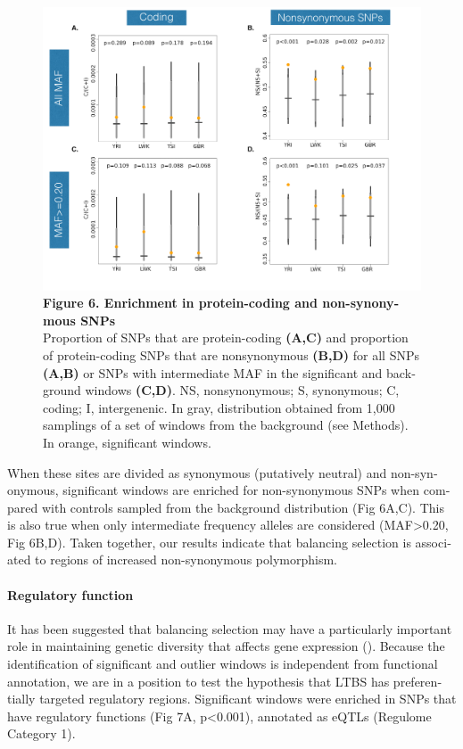 \begin{refsection}
\begin{otherlanguage}{english}
\begin{figure}[!ht]
\centering
\includegraphics[]{chap2_folder/Figures/Fig6.tiff}
\caption*{\textbf{Figure 6. Enrichment in protein-coding and non-synonymous SNPs}\\ 
Proportion of SNPs that are protein-coding \textbf{(A,C)} and proportion of protein-coding SNPs that are nonsynonymous \textbf{(B,D)} for all SNPs \textbf{(A,B)} or SNPs with intermediate MAF in the significant and background windows \textbf{(C,D)}. NS, nonsynonymous; S, synonymous; C, coding; I, intergenenic. In gray, distribution obtained from 1,000 samplings of a set of windows from the background (see Methods). In orange, significant windows.}
\end{figure}

When these sites are divided as synonymous (putatively neutral) and non-synonymous, significant windows are enriched for non-synonymous SNPs when compared with controls sampled from the background distribution (Fig 6A,C). This is also true when only intermediate frequency alleles are considered (MAF>0.20, Fig 6B,D). Taken together, our results indicate that balancing selection is associated to regions of increased non-synonymous polymorphism.

\paragraph{Regulatory function} It has been suggested that balancing selection may have a particularly important role in maintaining genetic diversity that affects gene expression (\cite{Leffler2013a,Savova2016}). Because the identification of significant and outlier windows is independent from functional annotation, we are in a position to test the hypothesis that LTBS has preferentially targeted regulatory regions. Significant windows were enriched in SNPs that have regulatory functions (Fig 7A, p<0.001), annotated as eQTLs (Regulome Category 1).


\end{otherlanguage}
\end{refsection}
